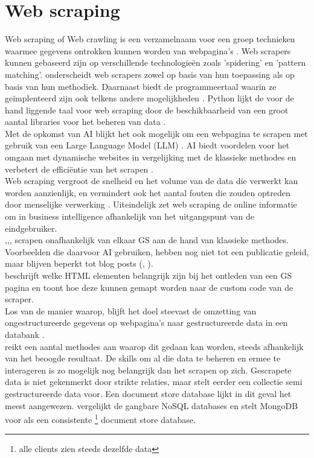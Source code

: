 \section{Web scraping}
Web scraping of Web crawling is een verzamelnaam voor een groep technieken waarmee gegevens ontrokken kunnen worden van webpagina's \autocite{Bhatt2023}. Web scrapers kunnen gebaseerd zijn op verschillende technologieën zoals 'spidering' en 'pattern matching'.\textcite{Lotfi2021} onderscheidt web scrapers zowel op basis van hun toepassing als op basis van hun  methodiek. Daarnaast biedt de programmeertaal waarin ze geïmplenteerd zijn ook telkens andere mogelijkheden \autocite{Bhatt2023}.
Python lijkt de voor de hand liggende taal voor web scraping door de beschikbaarheid van een groot aantal libraries voor het beheren van data \autocite{Kumar2023}.\\
Met de opkomst van AI blijkt het ook mogelijk om een webpagina te scrapen met gebruik van een Large Language Model (LLM) \autocite{Ahluwalia2024}. AI biedt voordelen voor het omgaan met dynamische websites in vergelijking met de klassieke methodes en verbetert de efficiëntie van het scrapen \autocite{Ayuso2024}.\\
Web scraping vergroot de snelheid en het volume van de data die verwerkt kan worden aanzienlijk, en vermindert ook het aantal fouten die zouden optreden door menselijke verwerking \autocite{Bhatt2023}. Uiteindelijk zet web scraping de online informatie om in business intelligence afhankelijk van het uitgangspunt van de eindgebruiker.\\
\textcite{Pratiba2018},\textcite{Rafsanjani2022},\textcite{Amin2024},\textcite{Sulistya2024} scrapen onafhankelijk van elkaar GS aan de hand van klassieke methodes.\\
Voorbeelden die daarvoor AI gebruiken, hebben nog niet tot een publicatie geleid, maar blijven beperkt tot blog posts (\autocite{Serpapiai2025}, \autocite{Anthropic2025}).\\
\textcite{Yang2017} beschrijft welke HTML elementen belangrijk zijn bij het ontleden van een GS pagina en \textcite{Rahmatulloh2020} toont hoe deze kunnen gemapt worden naar de custom code van de scraper.\\
Los van de manier waarop, blijft het doel steevast de omzetting van ongestructureerde gegevens op webpagina's naar gestructureerde data in een databank \autocite{Singrodia2019}.\\
\textcite{Mitchell2015} reikt een aantal methodes aan waarop dit gedaan kan worden, steeds afhankelijk van het beoogde resultaat. De skills om al die data te beheren en ermee te interageren is zo mogelijk nog belangrijk dan het scrapen op zich. Gescrapete data is niet gekenmerkt door strikte relaties, maar stelt eerder een collectie semi gestructureerde data voor. Een document store database lijkt in dit geval het meest aangewezen. \textcite{Lourenco2015} vergelijkt de gangbare NoSQL databases en stelt MongoDB voor als een consistente \footnote{alle clients zien steeds dezelfde data} document store database.\\
